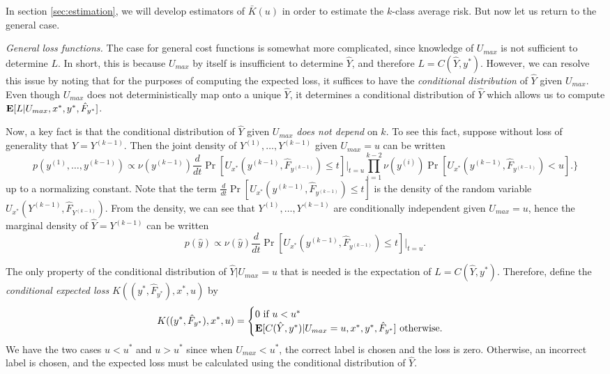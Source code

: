 \documentclass[12pt]{article}
\begin{document}
In section \ref{sec:estimation}, we will develop estimators of
$\bar{K}(u)$ in order to estimate the $k$-class average risk.
But now let us return to the general case.
\newline

\noindent \emph{General loss functions.}
The case for general cost functions is somewhat more complicated,
since knowledge of $U_{max}$ is not sufficient to determine $L$.  In
short, this is because $U_{max}$ by itself is insufficient to
determine $\hat{Y}$, and therefore $L=C(\hat{Y}, y^*)$.  However, we
can resolve this issue by noting that for the purposes of computing
the expected loss, it suffices to have the \emph{conditional
distribution} of $\hat{Y}$ given $U_{max}$.  Even though $U_{max}$
does not deterministically map onto a unique $\hat{Y}$, it determines
a conditional distribution of $\hat{Y}$ which allows us to compute
$\textbf{E}[L|U_{max}, x^*, y^*, \hat{F}_{y^*}]$.

Now, a key fact is that the conditional distribution of $\hat{Y}$
given $U_{max}$ \emph{does not depend} on $k$.  To see this fact,
suppose without loss of generality that $\hat{Y} = Y^{(k-1)}.$ Then
the joint density of $Y^{(1)},\hdots, Y^{(k-1)}$ given $U_{max} =
u$ can be written
\[
p(y^{(1)},\hdots, y^{(k-1)}) \propto 
\nu(y^{(k-1)})\frac{d}{dt}\Pr[U_{x^*}(y^{(k-1)}, \hat{F}_{y^{(k-1)}}) \leq t]|_{t=u}
\prod_{i=1}^{k-2}\nu(y^{(i)})\Pr[U_{x^*}(y^{(k-1)}, \hat{F}_{y^{(k-1)}}) < u].
\}
\]
up to a normalizing constant.  Note that the term
$\frac{d}{dt}\Pr[U_{x^*}(y^{(k-1)}, \hat{F}_{y^{(k-1)}}) \leq t]$ is the
density of the random variable
$U_{x^*}(Y^{(k-1)}, \hat{F}_{Y^{(k-1)}})$. From the density, we can see
that $Y^{(1)},\hdots, Y^{(k-1)}$ are conditionally independent given
$U_{max} = u$, hence the marginal density of $\hat{Y}=Y^{(k-1)}$ can
be written
\[
p(\hat{y}) \propto \nu(\hat{y})\frac{d}{dt}\Pr[U_{x^*}(y^{(k-1)}, \hat{F}_{y^{(k-1)}}) \leq t]|_{t=u}.
\]

The only property of the conditional distribution of $\hat{Y}|U_{max} = u$ that is needed is
the expectation of $L = C(\hat{Y}, y^*)$.  Therefore, define the \emph{conditional expected loss} $K((y^*, \hat{F}_{y^*}), x^*, u)$ by
\begin{equation}\label{eq:Kfunc}
K((y^*, \hat{F}_{y^*}), x^*, u) = \begin{cases} 0 \text{ if } u < u^*\\
\textbf{E}[C(\hat{Y}, y^*)|U_{max} = u, x^*, y^*, \hat{F}_{y^*}] \text{ otherwise.}
\end{cases}
\end{equation}
We have the two cases $u < u^*$ and $u > u^*$ since when $U_{max} <
u^*$, the correct label is chosen and the loss is zero.  Otherwise, an
incorrect label is chosen, and the expected loss must be calculated
using the conditional distribution of $\hat{Y}$.
\end{document}
